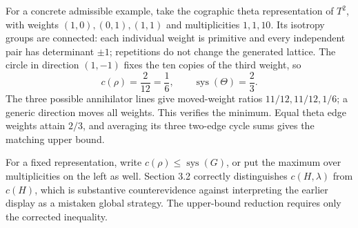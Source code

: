 \documentclass[10pt]{article}
\begin{document}
For a concrete admissible example, take the cographic theta representation of \(T^2\), with weights \((1,0),(0,1),(1,1)\) and multiplicities \(1,1,10\). Its isotropy groups are connected: each individual weight is primitive and every independent pair has determinant \(\pm1\); repetitions do not change the generated lattice. The circle in direction \((1,-1)\) fixes the ten copies of the third weight, so \[c(\rho)=\frac{2}{12}=\frac16,
       \qquad \operatorname{sys}(\Theta)=\frac23.\] The three possible annihilator lines give moved-weight ratios \(11/12,11/12,1/6\); a generic direction moves all weights. This verifies the minimum. Equal theta edge weights attain \(2/3\), and averaging its three two-edge cycle sums gives the matching upper bound.\par
For a fixed representation, write \(c(\rho)\leq\operatorname{sys}(G)\), or put the maximum over multiplicities on the left as well. Section 3.2 correctly distinguishes \(c(H,\lambda)\) from \(c(H)\), which is substantive counterevidence against interpreting the earlier display as a mistaken global strategy. The upper-bound reduction requires only the corrected inequality.\par
\end{document}

